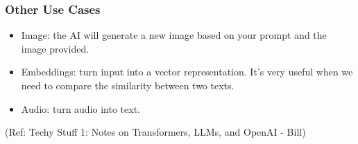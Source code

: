 \begin{frame}[fragile]\frametitle{Other Use Cases}
	

\begin{itemize}
\item Image: the AI will generate a new image based on your prompt and the image provided.
\item Embeddings: turn input into a vector representation. It’s very useful when we need to compare the similarity between two texts.
\item Audio: turn audio into text.
\end{itemize}	 

{\tiny (Ref: Techy Stuff 1: Notes on Transformers, LLMs, and OpenAI - Bill)}
			
\end{frame}
